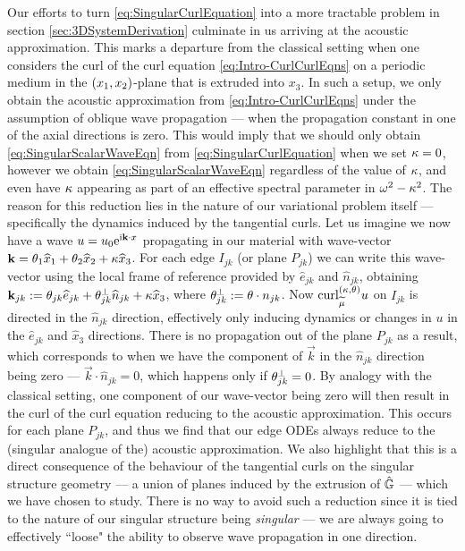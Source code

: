 Our efforts to turn \eqref{eq:SingularCurlEquation} into a more tractable problem in section \ref{sec:3DSystemDerivation} culminate in us arriving at the acoustic approximation.
This marks a departure from the classical setting when one considers the curl of the curl equation \eqref{eq:Intro-CurlCurlEqns} on a periodic medium in the $\left( x_1,x_2 \right)$-plane that is extruded into $x_3$.
In such a setup, we only obtain the acoustic approximation from \eqref{eq:Intro-CurlCurlEqns} under the assumption of oblique wave propagation --- when the propagation constant in one of the axial directions is zero.
This would imply that we should only obtain \eqref{eq:SingularScalarWaveEqn} from \eqref{eq:SingularCurlEquation} when we set $\kappa=0$, however we obtain \eqref{eq:SingularScalarWaveEqn} regardless of the value of $\kappa$, and even have $\kappa$ appearing as part of an effective spectral parameter in $\omega^2-\kappa^2$.
The reason for this reduction lies in the nature of our variational problem itself --- specifically the dynamics induced by the tangential curls.
Let us imagine we now have a wave $u = u_0\mathrm{e}^{\mathrm{i}\mathbf{k}\cdot x}$ propagating in our material with wave-vector $\mathbf{k} = \theta_1\widehat{x}_1 + \theta_2\widehat{x}_2 + \kappa\widehat{x}_3$.
For each edge $I_{jk}$ (or plane $P_{jk}$) we can write this wave-vector using the local frame of reference provided by $\widehat{e}_{jk}$ and $\widehat{n}_{jk}$, obtaining $\mathbf{k}_{jk} := \theta_{jk}\widehat{e}_{jk} + \theta_{jk}^\perp\widehat{n}_{jk} + \kappa\widehat{x}_3$, where $\theta_{jk}^\perp := \theta\cdot n_{jk}$.
Now $\mathrm{curl}_{\widetilde{\mu}}^{\left( \kappa, \theta \right)}u$ on $I_{jk}$ is directed in the $\widehat{n}_{jk}$ direction, effectively only inducing dynamics or changes in $u$ in the $\widehat{e}_{jk}$ and $\widehat{x}_3$ directions.
There is no propagation out of the plane $P_{jk}$ as a result, which corresponds to when we have the component of $\vec{k}$ in the $\widehat{n}_{jk}$ direction being zero --- $\vec{k}\cdot\widehat{n}_{jk}=0$, which happens only if $\theta_{jk}^\perp=0$.
By analogy with the classical setting, one component of our wave-vector being zero will then result in the curl of the curl equation reducing to the acoustic approximation.
This occurs for each plane $P_{jk}$, and thus we find that our edge ODEs always reduce to the (singular analogue of the) acoustic approximation.
We also highlight that this is a direct consequence of the behaviour of the tangential curls on the singular structure geometry --- a union of planes induced by the extrusion of $\hat{\mathbb{G}}$ --- which we have chosen to study.
There is no way to avoid such a reduction since it is tied to the nature of our singular structure being \emph{singular} --- we are always going to effectively ``loose" the ability to observe wave propagation in one direction.


